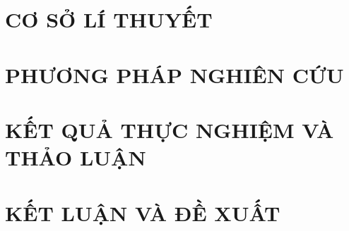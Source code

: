 \documentclass[a4paper,12pt,oneside]{report}
\begin{document}
\chapter{ CƠ SỞ LÍ THUYẾT}


\chapter{ PHƯƠNG PHÁP NGHIÊN CỨU}


\chapter{ KẾT QUẢ THỰC NGHIỆM VÀ THẢO LUẬN}


\chapter{ KẾT LUẬN VÀ ĐỀ XUẤT}






\end{document}
